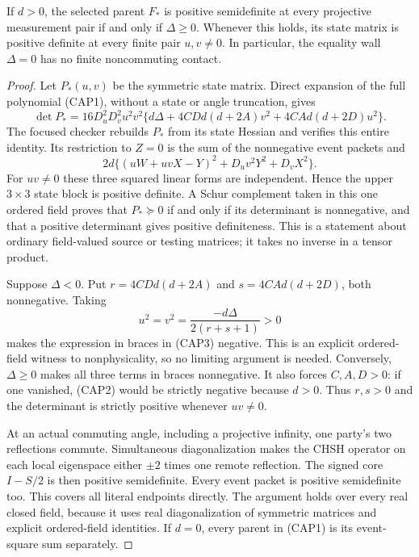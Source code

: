 \begin{proposition}
If $d>0$, the selected parent $F_*$ is positive semidefinite at every
projective measurement pair if and only if $\Delta\geq0$.  Whenever
this holds, its state matrix is positive definite at every finite pair
$u,v\ne0$.  In particular, the equality wall $\Delta=0$ has no finite
noncommuting contact.
\end{proposition}

\begin{proof}
Let $P_*(u,v)$ be the symmetric state matrix.  Direct expansion of the
full polynomial (CAP1), without a state or angle truncation, gives
\[
\det P_*=16D_u^2D_v^2u^2v^2
 \{d\Delta+4CDd(d+2A)v^2+4CAd(d+2D)u^2\}.
\tag{CAP3}
\]
The focused checker rebuilds $P_*$ from its state Hessian and verifies
this entire identity.  Its restriction to $Z=0$ is the sum of the
nonnegative event packets and
\[
2d\{(uW+uvX-Y)^2+D_uv^2Y^2+D_vX^2\}.
\tag{CAP4}
\]
For $uv\ne0$ these three squared linear forms are independent.  Hence
the upper $3\times3$ state block is positive definite.  A Schur
complement taken in this one ordered field proves that $P_*\succeq0$
if and only if its determinant is nonnegative, and that a positive
determinant gives positive definiteness.  This is a statement about
ordinary field-valued source or testing matrices; it takes no inverse
in a tensor product.

Suppose $\Delta<0$.  Put $r=4CDd(d+2A)$ and
$s=4CAd(d+2D)$, both nonnegative.  Taking
\[
u^2=v^2=\frac{-d\Delta}{2(r+s+1)}>0
\]
makes the expression in braces in (CAP3) negative.  This is an explicit
ordered-field witness to nonphysicality, so no limiting argument is
needed.  Conversely, $\Delta\geq0$ makes all three terms in braces
nonnegative.  It also forces $C,A,D>0$: if one vanished, (CAP2) would
be strictly negative because $d>0$.  Thus $r,s>0$ and the determinant
is strictly positive whenever $uv\ne0$.

At an actual commuting angle, including a projective infinity, one
party's two reflections commute.  Simultaneous diagonalization makes
the CHSH operator on each local eigenspace either $\pm2$ times one
remote reflection.  The signed core $I-S/2$ is then positive
semidefinite.  Every event packet is positive semidefinite too.  This
covers all literal endpoints directly.  The argument holds over every
real closed field, because it uses real diagonalization of symmetric
matrices and explicit ordered-field identities.  If $d=0$, every
parent in (CAP1) is its event-square sum separately.
\end{proof}

